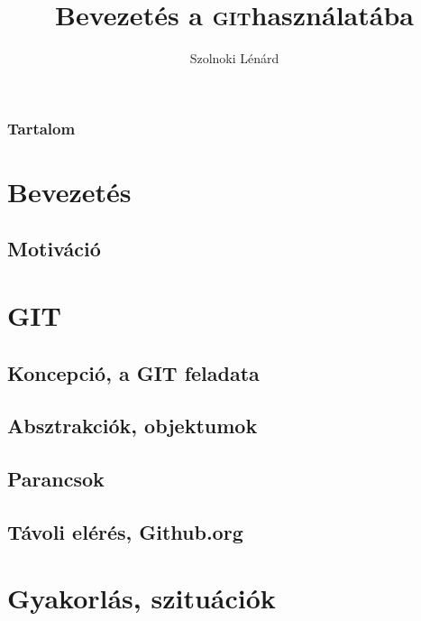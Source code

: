 

\newcommand{\git}{\textsc{git}}

\title{Bevezetés a \git használatába}
\author[Szolnoki Lénárd]{Szolnoki Lénárd}




\begin{frame}
 \titlepage
\end{frame}

\begin{frame}[noframenumbering]
 \frametitle{Tartalom}
 \tableofcontents
\end{frame}

\section{Bevezetés}
	\subsection{Motiváció}

\section{GIT}
	\subsection{Koncepció, a GIT feladata}
	\subsection{Absztrakciók, objektumok}
	\subsection{Parancsok}
	\subsection{Távoli elérés, Github.org}

\section{Gyakorlás, szituációk}
